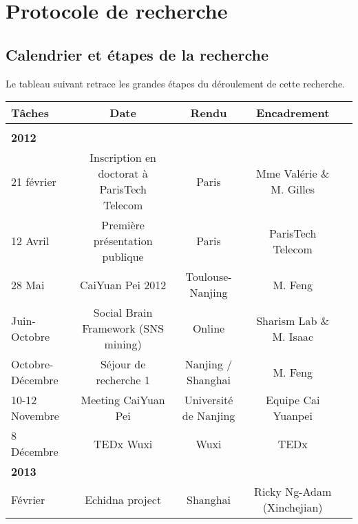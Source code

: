 \chapter{Protocole de recherche}

\section*{Calendrier et étapes de la recherche}

Le tableau suivant retrace les grandes étapes du déroulement de cette recherche.

{\small
\begin{table}[h!]
\begin{tabulary}{\linewidth}{ l C C C C}

    \textbf{Tâches} &  
    \textbf{Date} & 
    \textbf{Rendu} &
    \textbf{Encadrement} \\
    
    \hline \\[-1.2ex]

    \textbf{2012}  & & & \\

    21 février & 
    Inscription en doctorat à ParisTech Telecom &
    Paris & 
    Mme Valérie  \& M. Gilles  \\

    12 Avril & 
    Première présentation publique &
    Paris & 
    ParisTech Telecom \\

    28 Mai & 
    CaiYuan Pei 2012&
    Toulouse-Nanjing & 
    M.  Feng \\
    
    Juin-Octobre& 
    Social Brain Framework (SNS mining)&
    Online & 
    Sharism Lab \& M. Isaac  \\

    Octobre-Décembre & 
    Séjour de recherche 1 &
    Nanjing / Shanghai & 
    M.  Feng \\

    10-12 Novembre & 
    Meeting CaiYuan Pei &
    Université de Nanjing & 
    Equipe Cai Yuanpei \\

    8 Décembre & 
    TEDx Wuxi &
    Wuxi & 
    TEDx \\

    \textbf{2013}  & & & \\

    Février & 
    Echidna project  &
    Shanghai & 
    Ricky Ng-Adam (Xinchejian) \\


\end{tabulary}
\end{table}}
